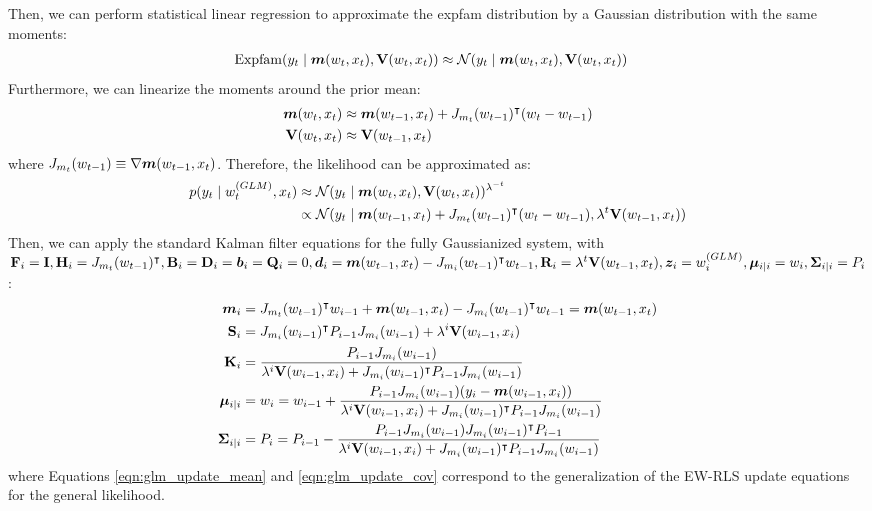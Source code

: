 Then, we can perform statistical linear regression to approximate the expfam distribution by a
Gaussian distribution with the same moments:
\begin{align}
    \mathrm{Expfam}(y_t \mid {\bm{m}}(w_t, x_t), \mathbf{V}(w_t, x_t)) &\approx \mathcal{N}(y_t \mid {\bm{m}}(w_t, x_t), \mathbf{V}(w_t, x_t))
\end{align}
Furthermore, we can linearize the moments around the prior mean:
\begin{align}
    {\bm{m}}(w_t, x_t) &\approx {\bm{m}}(w_{t-1}, x_t) + J_{m_t}(w_{t-1})^{\intercal} (w_t - w_{t-1}) \\
    \mathbf{V}(w_t, x_t) &\approx \mathbf{V}(w_{t-1}, x_t)
\end{align}
where $J_{m_t}(w_{t-1}) \equiv \nabla {\bm{m}}(w_{t-1}, x_t)$.
Therefore, the likelihood can be approximated as:
\begin{align}
    p(y_t \mid w_t^{(GLM)}, x_t) &\approx \mathcal{N}(y_t \mid {\bm{m}}(w_t, x_t), \mathbf{V}(w_t, x_t))^{\lambda^{-t}} \\
    &\propto \mathcal{N}(y_t \mid {\bm{m}}(w_{t-1}, x_t) + J_{m_t}(w_{t-1})^{\intercal}(w_t - w_{t-1}), \lambda^{t} \mathbf{V}(w_{t-1}, x_t))
\end{align}
Then, we can apply the standard Kalman filter equations for the fully Gaussianized system, 
with $\mathbf{F}_i = \mathbf{I}, \mathbf{H}_i = J_{m_t}(w_{t-1})^{\intercal}, \mathbf{B}_i = \mathbf{D}_i = {\bm{b}}_i = \mathbf{Q}_i = 0, {\bm{d}}_i = {\bm{m}}(w_{t-1}, x_t) - J_{m_i}(w_{t-1})^{\intercal}w_{t-1}, \mathbf{R}_i = \lambda^{t} \mathbf{V}(w_{t-1}, x_t),
{\bm{z}}_i = w_i^{(GLM)}, \boldsymbol{\mu}_{i|i} = w_i, \boldsymbol{\Sigma}_{i|i} = P_{i}$:
\begin{align}
    {\bm{m}}_i &= J_{m_t}(w_{t-1})^{\intercal} w_{i-1} + {\bm{m}}(w_{t-1}, x_t) - J_{m_i}(w_{t-1})^{\intercal}w_{t-1} = {\bm{m}}(w_{t-1}, x_t) \\
    \mathbf{S}_i &= J_{m_i}(w_{i-1})^{\intercal} P_{i-1} J_{m_i}(w_{i-1}) + \lambda^{i} \mathbf{V}(w_{i-1}, x_i) \\
    \mathbf{K}_i &= \frac{P_{i-1} J_{m_i}(w_{i-1})}{\lambda^{i} \mathbf{V}(w_{i-1}, x_i)
    + J_{m_i}(w_{i-1})^{\intercal} P_{i-1} J_{m_i}(w_{i-1})} \\
    \boldsymbol{\mu}_{i|i} &= w_{i} = w_{i-1} + 
    \frac{P_{i-1} J_{m_i}(w_{i-1}) (y_i - {\bm{m}}(w_{i-1}, x_i))}{\lambda^{i} \mathbf{V}(w_{i-1}, x_i)
    + J_{m_i}(w_{i-1})^{\intercal} P_{i-1} J_{m_i}(w_{i-1})} \label{eqn:glm_update_mean} \\
    \boldsymbol{\Sigma}_{i|i} &= P_{i} = P_{i-1} - 
    \frac{P_{i-1} J_{m_i}(w_{i-1}) J_{m_i}(w_{i-1})^{\intercal} P_{i-1}}{\lambda^{i} \mathbf{V}(w_{i-1}, x_i)
    + J_{m_i}(w_{i-1})^{\intercal} P_{i-1} J_{m_i}(w_{i-1})} \label{eqn:glm_update_cov}
\end{align}
where Equations \ref{eqn:glm_update_mean} and \ref{eqn:glm_update_cov} correspond to the generalization
of the EW-RLS update equations for the general likelihood.

